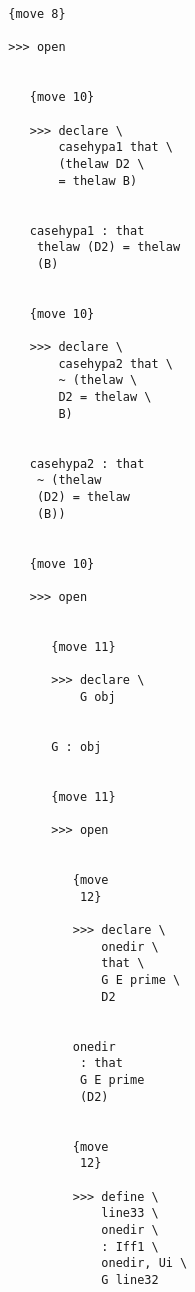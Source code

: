 \documentclass[12pt]{article}
\begin{document}
\begin{verbatim}
                           {move 8}

                           >>> open


                              {move 10}

                              >>> declare \
                                  casehypa1 that \
                                  (thelaw D2 \
                                  = thelaw B)


                              casehypa1 : that 
                               thelaw (D2) = thelaw 
                               (B)


                              {move 10}

                              >>> declare \
                                  casehypa2 that \
                                  ~ (thelaw \
                                  D2 = thelaw \
                                  B)


                              casehypa2 : that 
                               ~ (thelaw 
                               (D2) = thelaw 
                               (B))


                              {move 10}

                              >>> open


                                 {move 11}

                                 >>> declare \
                                     G obj


                                 G : obj


                                 {move 11}

                                 >>> open


                                    {move 
                                     12}

                                    >>> declare \
                                        onedir \
                                        that \
                                        G E prime \
                                        D2


                                    onedir 
                                     : that 
                                     G E prime 
                                     (D2)


                                    {move 
                                     12}

                                    >>> define \
                                        line33 \
                                        onedir \
                                        : Iff1 \
                                        onedir, Ui \
                                        G line32



\end{verbatim}
\end{document}
